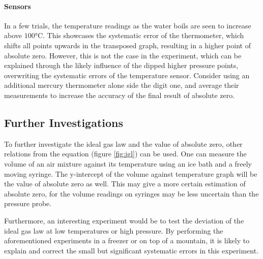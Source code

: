 \documentclass[a4paper,12pt]{article}
\begin{document}
\paragraph{Sensors}
In a few trials, the temperature readings as the water boils are seen to increase above $100\si{\celsius}$. This showcases the systematic error of the thermometer, which shifts all points upwards in the transposed graph, resulting in a higher point of absolute zero. However, this is not the case in the experiment, which can be explained through the likely influence of the dipped higher pressure points, overwriting the systematic errors of the temperature sensor. Consider using an additional mercury thermometer alone side the digit one, and average their measurements to increase the accuracy of the final result of absolute zero.

\subsection{Further Investigations}
To further investigate the ideal gas law and the value of absolute zero, other relations from the equation (figure \ref{fig:igl}) can be used. One can measure the volume of an air mixture against its temperature using an ice bath and a freely moving syringe. The y-intercept of the volume against temperature graph will be the value of absolute zero as well. This may give a more certain estimation of absolute zero, for the volume readings on syringes may be less uncertain than the pressure probe.

Furthermore, an interesting experiment would be to test the deviation of the ideal gas law at low temperatures or high pressure. By performing the aforementioned experiments in a freezer or on top of a mountain, it is likely to explain and correct the small but significant systematic errors in this experiment.

\newpage
\nocite{*}
\printbibliography


\newpage
\end{document}
